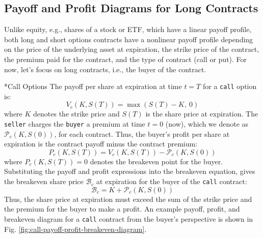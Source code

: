 \documentclass[11pt]{article}
\makeatletter
\theoremstyle{definition}
\renewcommand\subsubsection{\@startsection
	{subsubsection}{2}{0mm}
	{-0.05in}
	{-0.5\baselineskip}
	{\normalfont\normalsize\itshape\bfseries}}
\makeatother
\begin{document}
\subsection{Payoff and Profit Diagrams for Long Contracts}
Unlike equity, e.g., shares of a stock or ETF, which have a linear payoff profile, both long and short options contracts have a nonlinear payoff profile depending on the price of the underlying asset at expiration, 
the strike price of the contract, the premium paid for the contract, and the type of contract (call or put).
For now, let's focus on long contracts, i.e., the buyer of the contract.

\subsubsection*{Call Options}
The payoff per share at expiration at time $t = T$ for a \texttt{call} option is:
\begin{equation}
V_{c}(K,S(T)) = \max\left(S(T) - K,~0\right)
\end{equation}
where $K$ denotes the strike price and $S(T)$ is the share price at expiration. 
The \texttt{seller} charges the \texttt{buyer} a premium at time $t=0$ (now), which we denote as $\mathcal{P}_{c}(K,S(0))$, for each contract.
Thus, the buyer's profit per share at expiration is the contract payoff minus the contract premium:
\begin{equation}
P_{c}(K,S(T)) = V_{c}(K,S(T)) -  \mathcal{P}_{c}(K,S(0))
\end{equation}
where $P_{c}(K,S(T)) = 0$ denotes the breakeven point for the buyer. 
Substituting the payoff and profit expressions into the breakeven equation, 
gives the breakeven share price $\mathcal{B}_{c}$ at expiration for the buyer 
of the \texttt{call} contract:
\begin{equation}
\mathcal{B}_{c} = K + \mathcal{P}_{c}(K,S(0))
\end{equation}
Thus, the share price at expiration must exceed the sum of the strike price and the premium for the buyer to make a profit.
An example payoff, profit, and breakeven diagram for a \texttt{call} contract from the buyer's perspective 
is shown in Fig. \ref{fig:call-payoff-profit-breakeven-diagram}.  
\end{document}
